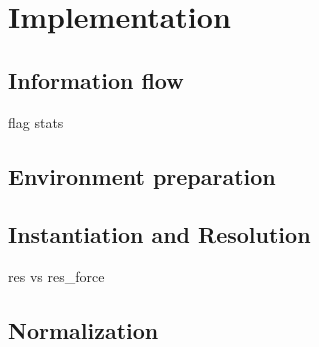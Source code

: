 \chapter{Implementation}\label{chapter:implementation}

\section{Information flow}

flag stats

\section{Environment preparation}

\section{Instantiation and Resolution}
res vs res\_force

\section{Normalization}